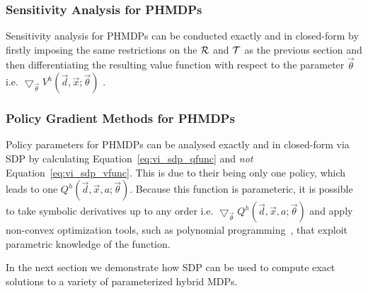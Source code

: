 \subsubsection{Sensitivity Analysis for PHMDPs}

Sensitivity analysis for PHMDPs can be conducted exactly and in closed-form by firstly imposing the same restrictions on the {\footnotesize $\mathcal{R}$} and {\footnotesize $\mathcal{T}$} as the previous section and then differentiating the resulting value function with respect to the parameter {\footnotesize $\vec{\theta}$} i.e. {\footnotesize $\bigtriangledown_{\vec{\theta}} V^{h}\left(\vec{d}, \vec{x}; \vec{\theta}\right)$ }.

\subsubsection{Policy Gradient Methods for PHMDPs}

Policy parameters for PHMDPs can be analysed exactly and in closed-form via SDP by calculating Equation~\eqref{eq:vi_sdp_qfunc} and \textit{not} Equation~\eqref{eq:vi_sdp_vfunc}. This is due to their being only one policy, which leads to one {\footnotesize $ Q^{h}(\vec{d}, \vec{x}, a; \vec{\theta}) $}. Because this function is parameteric, it is possible to take symbolic derivatives up to any order i.e. {\footnotesize $\bigtriangledown_{\vec{\theta}} Q^{h}(\vec{d}, \vec{x}, a; \vec{\theta})$ } and apply non-convex optimization tools, such as polynomial programming~\parencite{sherali1992global}, that exploit parametric knowledge of the function.

In the next section we demonstrate how SDP can be used to compute exact solutions to a variety of parameterized hybrid MDPs.